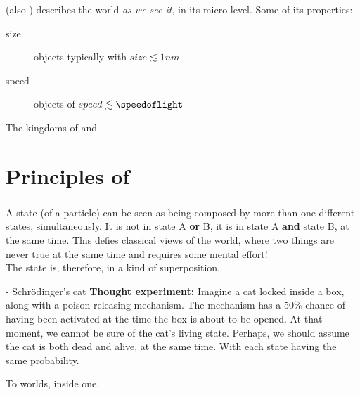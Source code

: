 \documentclass[aspectratio=43]{beamer}
\begin{document}
\begin{frame}{\qp}
\begin{card}
    \qp (also \qm) describes the world \textit{as we see it}, in its micro level. Some of its properties:
    \begin{description}
        \item[size] objects typically with $size \lesssim 1nm$
        \item[speed] objects of $speed \lesssim \speedoflight$
    \end{description}
\end{card}
\pagenumber
\end{frame}

\begin{frame}{The kingdoms of \cl and \qm}
\begin{card}
    \centering{}
\end{card}
\pagenumber
\end{frame}

\section{Principles of \qm}
\subsubsection{\qsp}
\begin{frame}{\qsp}
    \begin{card}
        A \q state (of a particle) can be seen as being composed by more than one different states, simultaneously. It is not in state A \textbf{or} B, it is in state A \textbf{and} state B, at the same time. This defies classical views of the world, where two things are never true at the same time and requires some mental effort!\\
        The state is, therefore, in a kind of superposition.
    \end{card}
\pagenumber
\end{frame}

\begin{frame}{\qsp - Schrödinger's cat}
    \textbf{Thought experiment:} Imagine a cat locked inside a box, along with a poison releasing mechanism. The mechanism has a 50\% chance of having been activated at the time the box is about to be opened. At that moment, we cannot be sure of the cat's living state. Perhaps, we should assume the cat is both dead and alive, at the same time. With each state having the same probability.
    \begin{center}
    \end{center}
    \begin{center}
        To worlds, inside one.
    \end{center}
\pagenumber
\end{frame}
\end{document}
